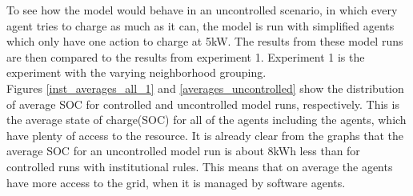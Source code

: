 \documentclass[a4paper]{article}
\begin{document}
To see how the model would behave in an uncontrolled scenario, in which every agent tries to charge as much as it can, the model 
is run with simplified agents which only have one action to charge at 5kW. The results from these model runs are then compared to the 
results from experiment 1. Experiment 1 is the experiment with the varying neighborhood grouping.\\
Figures \ref{inst_averages_all_1} and \ref{averages_uncontrolled} show the distribution of 
average SOC for controlled and uncontrolled model runs, respectively. 
This is the average state of charge(SOC) for all of the agents including the agents, which have plenty of access to the resource. 
It is already clear from the graphs that the average 
SOC for an uncontrolled model run is about 8kWh less than for controlled runs with institutional rules. This means that on average 
the agents have more access to the grid, when it is managed by software agents. 
\end{document}

